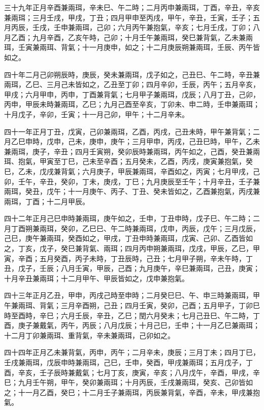\begin{pinyinscope}
三十九年正月辛酉兼兩珥，辛未巳、午二時；二月丙申兼兩珥，丁酉，辛丑，辛亥兼兩珥；三月壬戌，甲戌，丁丑；四月甲申至丙戌，甲午，辛丑，壬寅，壬子；五月丙辰，壬戌，壬申兼兩珥，己卯；六月丙午兼抱氣，辛亥；七月壬戌，丁卯；八月乙酉；九月辛酉，乙亥午時，己卯；十月壬午兼兩珥，癸巳兼背氣，乙未兼兩珥，壬寅兼兩珥、背氣；十一月庚申，如之；十二月庚辰朔兼兩珥，壬辰、丙午皆如之。

四十年二月己卯朔辰時，庚辰，癸未兼兩珥，戊子如之，己丑巳、午二時，辛丑兼兩珥，乙巳、三月己未皆如之，乙丑至丁卯；四月辛卯，壬辰，丙午；五月辛亥，甲戌；六月甲申，丙申，丁酉兼背氣；七月甲子兼兩珥，戊辰；八月丁丑，己卯，丙申，甲辰未時兼兩珥，乙巳；九月己酉至辛亥，丁卯未、申二時，壬申兼兩珥；十月戊子，辛卯，壬寅；十一月己卯，甲午；十二月辛未。

四十一年正月丁丑，戊寅，己卯兼兩珥，乙酉，丙戌，己丑未時，甲午兼背氣；二月乙巳申時，戊申，己未，庚申，庚午；三月甲申，丙戌，己丑巳時，甲午，乙未兼兩珥，庚子，辛丑；四月壬寅朔，癸卯辰時兼兩珥，丙午如之，己酉，癸丑兼兩珥、抱氣，甲寅至丁巳，己未至辛酉；五月癸未，乙酉，丙戌，庚寅兼抱氣，癸巳，乙未，戊戌兼背氣；六月庚子，甲辰兼兩珥，辛酉如之，丙寅；七月甲戌，己卯，壬午，辛丑，癸卯，丁未，庚戌，丁巳；九月庚辰至壬午；十月辛丑，壬子兼兩珥，癸丑，戊午；十一月庚午、丙子、丁丑、癸未皆如之，乙酉兼抱氣，丙戌兼兩珥，丁酉；十二月甲辰。

四十二年正月己巳申時兼兩珥，庚午如之，壬申，丁丑申時，戊子巳、午二時；二月丁酉朔兼兩珥，癸卯，乙巳巳、午二時兼兩珥，戊申，丙辰，戊午；三月戊辰，己巳，庚午兼兩珥，癸酉如之，甲戌，丁丑申時兼兩珥，戊寅、己卯、乙酉皆如之，丁亥，戊子，癸巳兼背氣、兩珥；四月丙申朔兼兩珥，戊戌，甲辰，乙巳，甲寅，辛酉；五月癸酉，丙子未時，丁丑辰時，己丑；七月甲子朔，辛未午時，丁丑，戊子，壬辰；八月壬寅，甲辰，己酉；九月庚午，辛巳兼兩珥，己丑，庚寅；十月辛丑兼兩珥；十二月甲午、甲辰皆如之，戊申兼抱氣。

四十三年正月乙丑，甲申，丙戌己時至申時；二月癸巳巳、午、申三時兼兩珥，甲午兼兩珥、背氣；三月辛酉朔，己丑；四月壬寅，癸卯，己酉；五月甲子，丁卯巳時至酉時，辛巳；六月壬辰，辛丑，乙巳；閏六月癸未；七月己丑巳、午二時，丁酉，庚子兼戴氣，丙午，丙辰；八月戊辰；十月己巳，壬申；十一月乙巳兼兩珥；十二月丁卯兼兩珥、重背氣，辛未兼兩珥，己卯如之。

四十四年正月乙未兼背氣，丙申，丙午；二月辛未，庚辰；三月丁未；四月丁巳，壬戌兼兩珥，戊辰申時兼兩珥，己巳，壬申，癸酉，甲戌兼兩珥；五月戊子，丁酉，辛亥，壬子辰時兼戴氣；七月丁亥，庚寅，辛亥；八月戊午，辛酉，甲戌，辛巳；九月壬午朔，甲午，癸卯兼兩珥；十月丙辰，壬戌兼兩珥，癸亥、己卯皆如之；十一月乙酉，癸巳；十二月壬子兼兩珥，丙辰兼背氣，辛酉，辛未，甲戌兼抱氣。


\end{pinyinscope}
